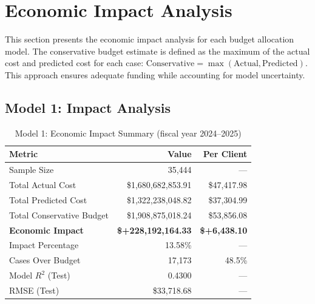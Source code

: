 \renewcommand{\FiscalYear}{(fiscal year 2024--2025)}

\section{Economic Impact Analysis}
\label{sec:economic_impact}

This section presents the economic impact analysis for each budget allocation model. The conservative budget estimate is defined as the maximum of the actual cost and predicted cost for each case: $\text{Conservative} = \max(\text{Actual}, \text{Predicted})$. This approach ensures adequate funding while accounting for model uncertainty.

\subsection{Model 1: Impact Analysis}
\label{subsec:model1_impact}

\begin{table}[htbp]
\centering
\small
\caption{Model 1: Economic Impact Summary \FiscalYear}
\label{tab:model1_impact_summary}
\begin{tabular}{lrr}
\toprule
\textbf{Metric} & \textbf{Value} & \textbf{Per Client} \\
\midrule
Sample Size & 35,444 & --- \\
\midrule
Total Actual Cost & \$1,680,682,853.91 & \$47,417.98 \\
Total Predicted Cost & \$1,322,238,048.82 & \$37,304.99 \\
Total Conservative Budget & \$1,908,875,018.24 & \$53,856.08 \\
\midrule
\textbf{Economic Impact} & \textbf{\$+228,192,164.33} & \textbf{\$+6,438.10} \\
Impact Percentage & 13.58\% & --- \\
\midrule
Cases Over Budget & 17,173 & 48.5\% \\
\midrule
Model $R^2$ (Test) & 0.4300 & --- \\
RMSE (Test) & \$33,718.68 & --- \\
\bottomrule
\end{tabular}
\end{table}

